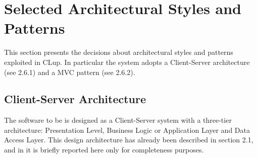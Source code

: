 \section{Selected Architectural Styles and Patterns}
This section presents the decisions about architectural styles and patterns exploited in CLup. In particular the system adopts a Client-Server architecture (see 2.6.1) and a MVC pattern (see 2.6.2).

\subsection{Client-Server Architecture}
The software to be is designed as a Client-Server system with a three-tier architecture: Presentation Level, Business Logic or Application Layer and Data Access Layer. This design architecture has already been described in section 2.1, and in it is briefly reported here only for completeness purposes.

